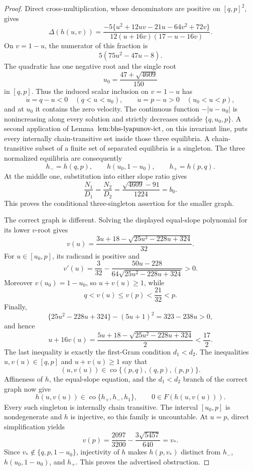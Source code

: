 \documentclass{article}
\begin{document}
\begin{proof}
Direct cross-multiplication, whose denominators are positive on \([q,p]^2\), gives
\[
 \Delta(h(u,v))
 =\frac{-5\{u^2+12uv-21u-64v^2+72v\}}
 {12(u+16v)(17-u-16v)}.
\]
On \(v=1-u\), the numerator of this fraction is
\[
 5(75u^2-47u-8).
\]
The quadratic has one negative root and the single root
\[
 u_0=\frac{47+\sqrt{4609}}{150}
\]
in \([q,p]\).  Thus the induced scalar inclusion on \(v=1-u\) has
\[
 \dot u=q-u<0\quad(q<u<u_0),
 \qquad
 \dot u=p-u>0\quad(u_0<u<p),
\]
and at \(u_0\) it contains the zero velocity.  The continuous function \(-|u-u_0|\) is nonincreasing along every solution and strictly decreases outside \(\{q,u_0,p\}\).  A second application of Lemma~\(\textnormal{lem:bhs-lyapunov-ict}\), on this invariant line, puts every internally chain-transitive set inside those three equilibria.  A chain-transitive subset of a finite set of separated equilibria is a singleton.  The three normalized equilibria are consequently
\[
 h_-=h(q,p),\qquad h(u_0,1-u_0),\qquad h_+=h(p,q).
\]
At the middle one, substitution into either slope ratio gives
\[
 \frac{N_1}{D_1}=\frac{N_2}{D_2}
 =\frac{\sqrt{4609}-91}{1224}=b_0.
\]
This proves the conditional three-singleton assertion for the smaller graph.

The correct graph is different.  Solving the displayed equal-slope polynomial for its lower \(v\)-root gives
\[
 v(u)=\frac{3u+18-\sqrt{25u^2-228u+324}}{32}.
\]
For \(u\in[u_0,p]\), its radicand is positive and
\[
 v'(u)=\frac3{32}-
 \frac{50u-228}{64\sqrt{25u^2-228u+324}}>0.
\]
Moreover \(v(u_0)=1-u_0\), so \(u+v(u)\ge1\), while
\[
 q<v(u)\le v(p)<\frac{21}{32}<p.
\]
Finally,
\[
 \{25u^2-228u+324\}-(5u+1)^2=323-238u>0,
\]
and hence
\[
 u+16v(u)=\frac{5u+18-\sqrt{25u^2-228u+324}}2<\frac{17}{2}.
\]
The last inequality is exactly the first-Gram condition \(d_1<d_2\).  The inequalities \(u,v(u)\in[q,p]\) and \(u+v(u)\ge1\) say that
\[
 (u,v(u))\in\operatorname{co}\{(p,q),(q,p),(p,p)\}.
\]
Affineness of \(h\), the equal-slope equation, and the \(d_1<d_2\) branch of the correct graph now give
\[
 h(u,v(u))\in\operatorname{co}\{h_+,h_-,h_1\},
 \qquad
 0\in F(h(u,v(u))).
\]
Every such singleton is internally chain transitive.  The interval \([u_0,p]\) is nondegenerate and \(h\) is injective, so this family is uncountable.  At \(u=p\), direct simplification yields
\[
 v(p)=\frac{2097}{3200}-\frac{3\sqrt{5457}}{640}=v_*.
\]
Since \(v_*\notin\{q,p,1-u_0\}\), injectivity of \(h\) makes \(h(p,v_*)\) distinct from \(h_-\), \(h(u_0,1-u_0)\), and \(h_+\).  This proves the advertised obstruction.


\end{proof}
\end{document}
